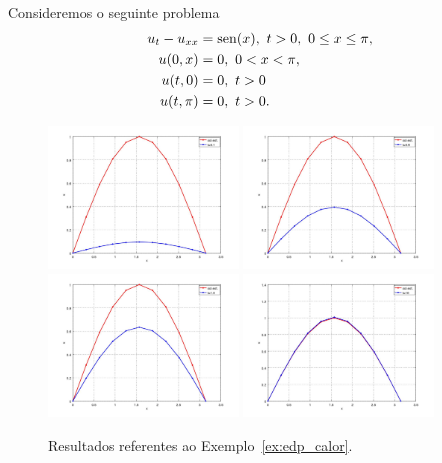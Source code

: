 \begin{ex}\label{ex:edp_calor}
  Consideremos o seguinte problema
  \begin{align}
    u_t - u_{xx} &= \operatorname{sen}(x),~t>0,~0\leq x \leq \pi,\\
    u(0,x) &= 0,~0<x<\pi,\\
    u(t,0) &= 0,~t>0\\
    u(t,\pi) &= 0,~t>0.
  \end{align}

\begin{figure}[h!]
  \centering
  \includegraphics[width=0.45\textwidth]{./cap_edp/dados/ex_edp_calor/ex_edp_calor_t01} 
  \includegraphics[width=0.45\textwidth]{./cap_edp/dados/ex_edp_calor/ex_edp_calor_t05}\\
  \includegraphics[width=0.45\textwidth]{./cap_edp/dados/ex_edp_calor/ex_edp_calor_t1} 
  \includegraphics[width=0.45\textwidth]{./cap_edp/dados/ex_edp_calor/ex_edp_calor_t10}
  \caption{Resultados referentes ao Exemplo~\ref{ex:edp_calor}.}
  \label{fig:ex_edp_calor}
\end{figure}


\end{ex}

